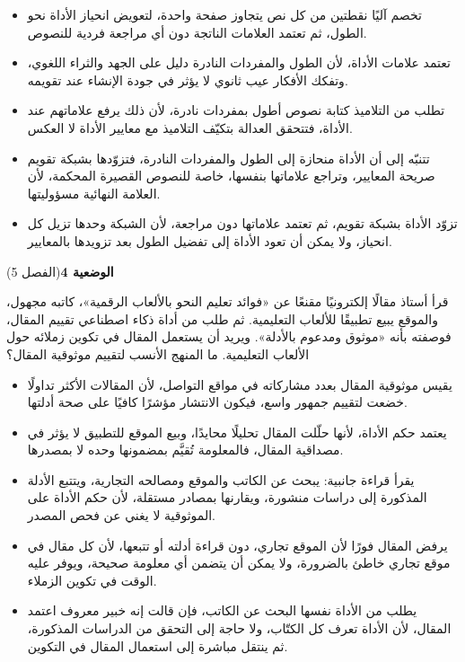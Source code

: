 \documentclass[11pt,a4paper]{article}
\begin{document}
\begin{itemize}[leftmargin=1.0cm, labelsep=6pt, itemsep=3pt, topsep=4pt, parsep=0pt]
  \item[\textbf{أ)}] تخصم آليًا نقطتين من كل نص يتجاوز صفحة واحدة، لتعويض انحياز الأداة نحو الطول، ثم تعتمد العلامات الناتجة دون أي مراجعة فردية للنصوص.
  \item[\textbf{ب)}] تعتمد علامات الأداة، لأن الطول والمفردات النادرة دليل على الجهد والثراء اللغوي، وتفكك الأفكار عيب ثانوي لا يؤثر في جودة الإنشاء عند تقويمه.
  \item[\textbf{ج)}] تطلب من التلاميذ كتابة نصوص أطول بمفردات نادرة، لأن ذلك يرفع علاماتهم عند الأداة، فتتحقق العدالة بتكيّف التلاميذ مع معايير الأداة لا العكس.
  \item[\textbf{د)}] تتنبّه إلى أن الأداة منحازة إلى الطول والمفردات النادرة، فتزوّدها بشبكة تقويم صريحة المعايير، وتراجع علاماتها بنفسها، خاصة للنصوص القصيرة المحكمة، لأن العلامة النهائية مسؤوليتها.
  \item[\textbf{هـ)}] تزوّد الأداة بشبكة تقويم، ثم تعتمد علاماتها دون مراجعة، لأن الشبكة وحدها تزيل كل انحياز، ولا يمكن أن تعود الأداة إلى تفضيل الطول بعد تزويدها بالمعايير.
\end{itemize}
\par\vspace{6pt}
\noindent
{\large\khatt\textbf{الوضعية 4}}\hfill{\small(الفصل 5)}\par\nopagebreak\vspace{3pt}
\setlength{\fboxsep}{7pt}\colorbox{gray!10}{\parbox{\dimexpr\linewidth-14pt}{قرأ أستاذ مقالًا إلكترونيًا مقنعًا عن «فوائد تعليم النحو بالألعاب الرقمية»، كاتبه مجهول، والموقع يبيع تطبيقًا للألعاب التعليمية. ثم طلب من أداة ذكاء اصطناعي تقييم المقال، فوصفته بأنه «موثوق ومدعوم بالأدلة». ويريد أن يستعمل المقال في تكوين زملائه حول الألعاب التعليمية. ما المنهج الأنسب لتقييم موثوقية المقال؟}}\par\nopagebreak
\begin{itemize}[leftmargin=1.0cm, labelsep=6pt, itemsep=3pt, topsep=4pt, parsep=0pt]
  \item[\textbf{أ)}] يقيس موثوقية المقال بعدد مشاركاته في مواقع التواصل، لأن المقالات الأكثر تداولًا خضعت لتقييم جمهور واسع، فيكون الانتشار مؤشرًا كافيًا على صحة أدلتها.
  \item[\textbf{ب)}] يعتمد حكم الأداة، لأنها حلّلت المقال تحليلًا محايدًا، وبيع الموقع للتطبيق لا يؤثر في مصداقية المقال، فالمعلومة تُقيَّم بمضمونها وحده لا بمصدرها.
  \item[\textbf{ج)}] يقرأ قراءة جانبية: يبحث عن الكاتب والموقع ومصالحه التجارية، ويتتبع الأدلة المذكورة إلى دراسات منشورة، ويقارنها بمصادر مستقلة، لأن حكم الأداة على الموثوقية لا يغني عن فحص المصدر.
  \item[\textbf{د)}] يرفض المقال فورًا لأن الموقع تجاري، دون قراءة أدلته أو تتبعها، لأن كل مقال في موقع تجاري خاطئ بالضرورة، ولا يمكن أن يتضمن أي معلومة صحيحة، ويوفر عليه الوقت في تكوين الزملاء.
  \item[\textbf{هـ)}] يطلب من الأداة نفسها البحث عن الكاتب، فإن قالت إنه خبير معروف اعتمد المقال، لأن الأداة تعرف كل الكتّاب، ولا حاجة إلى التحقق من الدراسات المذكورة، ثم ينتقل مباشرة إلى استعمال المقال في التكوين.
\end{itemize}
\end{document}

